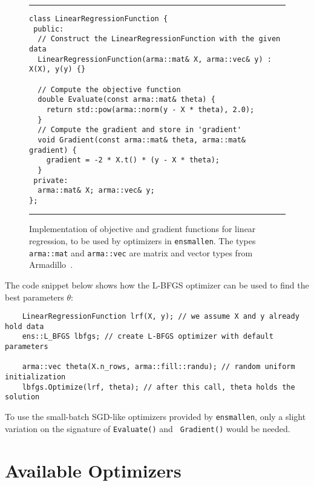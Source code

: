 \documentclass{article}
\begin{document}
\begin{figure}[!tb]
\hrule\vspace*{0.3ex}
\begin{verbatim}
class LinearRegressionFunction {
 public:
  // Construct the LinearRegressionFunction with the given data
  LinearRegressionFunction(arma::mat& X, arma::vec& y) : X(X), y(y) {}

  // Compute the objective function
  double Evaluate(const arma::mat& theta) {
    return std::pow(arma::norm(y - X * theta), 2.0);
  }
  // Compute the gradient and store in 'gradient'
  void Gradient(const arma::mat& theta, arma::mat& gradient) {
    gradient = -2 * X.t() * (y - X * theta);
  }
 private:
  arma::mat& X; arma::vec& y;
};
\end{verbatim}
\hrule\vspace*{0.3ex}
\caption
  {
  Implementation of objective and gradient functions for linear regression,
  to be used by optimizers in \texttt{ensmallen}.
  The types {\tt arma::mat} and {\tt arma::vec} are 
  matrix and vector types from Armadillo~\cite{sanderson2016armadillo}.
  }
\label{fig:LinearRegressionFunction}
\end{figure}

The code snippet below
shows how the L-BFGS optimizer can be used to find the best parameters $\theta$:

\vspace*{-0.4em}
\begin{verbatim}
    LinearRegressionFunction lrf(X, y); // we assume X and y already hold data
    ens::L_BFGS lbfgs; // create L-BFGS optimizer with default parameters

    arma::vec theta(X.n_rows, arma::fill::randu); // random uniform initialization
    lbfgs.Optimize(lrf, theta); // after this call, theta holds the solution
\end{verbatim}
\vspace*{-0.4em}

To use the small-batch SGD-like optimizers provided by {\tt ensmallen},
only a slight variation on the signature of {\tt Evaluate()} and {\tt
Gradient()} would be needed.

\vspace*{-0.3em}
\section{Available Optimizers}
\vspace*{-0.5em}
\end{document}
